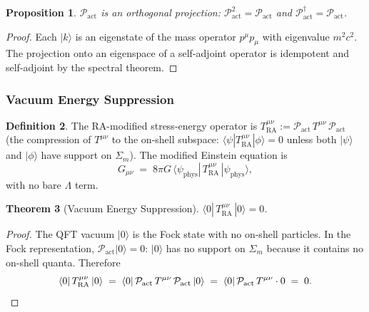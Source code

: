 \documentclass[11pt,a4paper]{article}
\theoremstyle{plain}
\newtheorem{theorem}{Theorem}[section]
\newtheorem{proposition}[theorem]{Proposition}
\theoremstyle{definition}
\newtheorem{definition}[theorem]{Definition}
\theoremstyle{remark}
\newcommand{\Pact}{\mathcal{P}_{\mathrm{act}}}
\newcommand{\Sigmam}{\Sigma_{m}}
\newcommand{\Tact}{T^{\mu\nu}_{\mathrm{RA}}}
\newcommand{\ket}[1]{|#1\rangle}
\newcommand{\bra}[1]{\langle #1|}
\begin{document}
\begin{proposition}
$\Pact$ is an orthogonal projection: $\Pact^{2} = \Pact$ and
$\Pact^{\dagger} = \Pact$.
\end{proposition}
\begin{proof}
Each $\ket{k}$ is an eigenstate of the mass operator $p^{\mu}p_{\mu}$ with
eigenvalue $m^{2}c^{2}$. The projection onto an eigenspace of a self-adjoint
operator is idempotent and self-adjoint by the spectral theorem.
\end{proof}

\subsubsection{Vacuum Energy Suppression}

\begin{definition}
The RA-modified stress-energy operator is $\Tact := \Pact\,T^{\mu\nu}\,\Pact$
(the compression of $T^{\mu\nu}$ to the on-shell subspace: $\bra{\psi}\Tact\ket{\phi} = 0$
unless both $\ket{\psi}$ and $\ket{\phi}$ have support on $\Sigmam$).
The modified Einstein equation is
\begin{equation}
  G_{\mu\nu}
  \;=\;
  8\pi G\,\langle\psi_{\mathrm{phys}}|\,\Tact\,|\psi_{\mathrm{phys}}\rangle,
\end{equation}
with no bare $\Lambda$ term.
\end{definition}

\begin{theorem}[Vacuum Energy Suppression]
\label{thm:vacuum}
$\langle 0|\,\Tact\,|0\rangle = 0$.
\end{theorem}
\begin{proof}
The QFT vacuum $\ket{0}$ is the Fock state with no on-shell particles. In the Fock
representation, $\Pact\ket{0} = 0$: $\ket{0}$ has no support on $\Sigmam$ because
it contains no on-shell quanta. Therefore
\begin{equation*}
  \langle 0|\,\Tact\,|0\rangle
  \;=\;
  \langle 0|\,\Pact\,T^{\mu\nu}\,\Pact\,|0\rangle
  \;=\;
  \langle 0|\,\Pact\,T^{\mu\nu}\cdot 0
  \;=\; 0. \qedhere
\end{equation*}
\end{proof}
\end{document}
